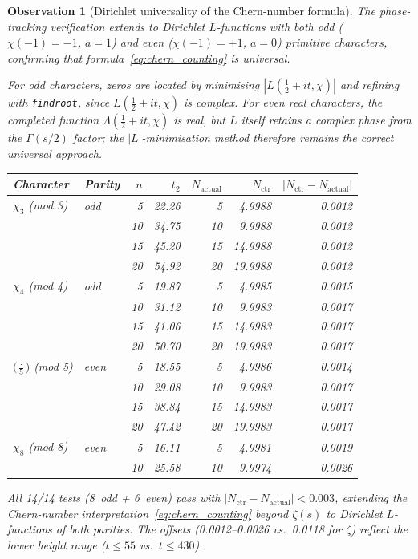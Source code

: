 \documentclass[11pt, a4paper]{article}
\theoremstyle{definition}
\theoremstyle{plain}
\newtheorem{observation}[theorem]{Observation}
\begin{document}
\begin{observation}[Dirichlet universality of the Chern-number formula]
\label{obs:chern_dirichlet}
The phase-tracking verification extends to Dirichlet $L$-functions
with both odd ($\chi(-1) = -1$, $a = 1$) and even ($\chi(-1) = +1$,
$a = 0$) primitive characters, confirming that
formula~\eqref{eq:chern_counting} is universal.

For odd characters, zeros are located by minimising
$|L(\tfrac{1}{2} + it, \chi)|$ and refining with \texttt{findroot},
since $L(\tfrac{1}{2} + it, \chi)$ is complex.
For even real characters, the completed function
$\Lambda(\tfrac{1}{2} + it, \chi)$ is real, but $L$ itself retains
a complex phase from the $\Gamma(s/2)$ factor; the $|L|$-minimisation
method therefore remains the correct universal approach.

\begin{center}
\small
\begin{tabular}{@{} l l r r r r r @{}}
\toprule
Character & Parity & $n$ & $t_2$ & $N_{\mathrm{actual}}$ & $N_{\mathrm{ctr}}$
  & $|N_{\mathrm{ctr}} - N_{\mathrm{actual}}|$ \\
\midrule
$\chi_3$ (mod 3) & odd &  5 & 22.26 &  5 &  4.9988 & 0.0012 \\
                  &     & 10 & 34.75 & 10 &  9.9988 & 0.0012 \\
                  &     & 15 & 45.20 & 15 & 14.9988 & 0.0012 \\
                  &     & 20 & 54.92 & 20 & 19.9988 & 0.0012 \\
\midrule
$\chi_4$ (mod 4) & odd &  5 & 19.87 &  5 &  4.9985 & 0.0015 \\
                  &     & 10 & 31.12 & 10 &  9.9983 & 0.0017 \\
                  &     & 15 & 41.06 & 15 & 14.9983 & 0.0017 \\
                  &     & 20 & 50.70 & 20 & 19.9983 & 0.0017 \\
\midrule
$\bigl(\frac{\cdot}{5}\bigr)$ (mod 5) & even &  5 & 18.55 &  5 &  4.9986 & 0.0014 \\
                  &      & 10 & 29.08 & 10 &  9.9983 & 0.0017 \\
                  &      & 15 & 38.84 & 15 & 14.9983 & 0.0017 \\
                  &      & 20 & 47.42 & 20 & 19.9983 & 0.0017 \\
\midrule
$\chi_8$ (mod 8) & even &  5 & 16.11 &  5 &  4.9981 & 0.0019 \\
                  &      & 10 & 25.58 & 10 &  9.9974 & 0.0026 \\
\bottomrule
\end{tabular}
\end{center}
\noindent
All 14/14 tests (8~odd + 6~even) pass with
$|N_{\mathrm{ctr}} - N_{\mathrm{actual}}| < 0.003$,
extending the Chern-number interpretation~\eqref{eq:chern_counting}
beyond $\zeta(s)$ to Dirichlet $L$-functions of both parities.
The offsets (0.0012--0.0026 vs.\ 0.0118 for $\zeta$) reflect
the lower height range ($t \le 55$ vs.\ $t \le 430$).


\end{observation}
\end{document}
